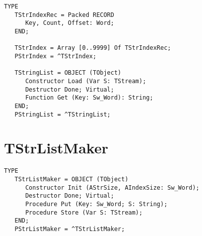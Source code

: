\begin{verbatim}
TYPE
   TStrIndexRec = Packed RECORD
      Key, Count, Offset: Word;
   END;

   TStrIndex = Array [0..9999] Of TStrIndexRec;
   PStrIndex = ^TStrIndex;

   TStringList = OBJECT (TObject)
      Constructor Load (Var S: TStream);
      Destructor Done; Virtual;
      Function Get (Key: Sw_Word): String;
   END;
   PStringList = ^TStringList;
\end{verbatim}

\section{TStrListMaker}
\label{se:TStrListMaker}

\begin{verbatim}
TYPE
   TStrListMaker = OBJECT (TObject)
      Constructor Init (AStrSize, AIndexSize: Sw_Word);
      Destructor Done; Virtual;
      Procedure Put (Key: Sw_Word; S: String);
      Procedure Store (Var S: TStream);
   END;
   PStrListMaker = ^TStrListMaker;
\end{verbatim}

